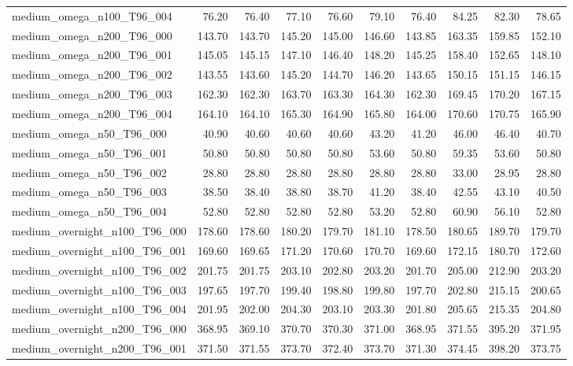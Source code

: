 \begin{table}[htbp]
\begin{tabular}{lrrrrrrrrr}
medium\_omega\_n100\_T96\_004 & 76.20 & 76.40 & 77.10 & 76.60 & 79.10 & 76.40 & 84.25 & 82.30 & 78.65 \\
medium\_omega\_n200\_T96\_000 & 143.70 & 143.70 & 145.20 & 145.00 & 146.60 & 143.85 & 163.35 & 159.85 & 152.10 \\
medium\_omega\_n200\_T96\_001 & 145.05 & 145.15 & 147.10 & 146.40 & 148.20 & 145.25 & 158.40 & 152.65 & 148.10 \\
medium\_omega\_n200\_T96\_002 & 143.55 & 143.60 & 145.20 & 144.70 & 146.20 & 143.65 & 150.15 & 151.15 & 146.15 \\
medium\_omega\_n200\_T96\_003 & 162.30 & 162.30 & 163.70 & 163.30 & 164.30 & 162.30 & 169.45 & 170.20 & 167.15 \\
medium\_omega\_n200\_T96\_004 & 164.10 & 164.10 & 165.30 & 164.90 & 165.80 & 164.00 & 170.60 & 170.75 & 165.90 \\
medium\_omega\_n50\_T96\_000 & 40.90 & 40.60 & 40.60 & 40.60 & 43.20 & 41.20 & 46.00 & 46.40 & 40.70 \\
medium\_omega\_n50\_T96\_001 & 50.80 & 50.80 & 50.80 & 50.80 & 53.60 & 50.80 & 59.35 & 53.60 & 50.80 \\
medium\_omega\_n50\_T96\_002 & 28.80 & 28.80 & 28.80 & 28.80 & 28.80 & 28.80 & 33.00 & 28.95 & 28.80 \\
medium\_omega\_n50\_T96\_003 & 38.50 & 38.40 & 38.80 & 38.70 & 41.20 & 38.40 & 42.55 & 43.10 & 40.50 \\
medium\_omega\_n50\_T96\_004 & 52.80 & 52.80 & 52.80 & 52.80 & 53.20 & 52.80 & 60.90 & 56.10 & 52.80 \\
medium\_overnight\_n100\_T96\_000 & 178.60 & 178.60 & 180.20 & 179.70 & 181.10 & 178.50 & 180.65 & 189.70 & 179.70 \\
medium\_overnight\_n100\_T96\_001 & 169.60 & 169.65 & 171.20 & 170.60 & 170.70 & 169.60 & 172.15 & 180.70 & 172.60 \\
medium\_overnight\_n100\_T96\_002 & 201.75 & 201.75 & 203.10 & 202.80 & 203.20 & 201.70 & 205.00 & 212.90 & 203.20 \\
medium\_overnight\_n100\_T96\_003 & 197.65 & 197.70 & 199.40 & 198.80 & 199.80 & 197.70 & 202.80 & 215.15 & 200.65 \\
medium\_overnight\_n100\_T96\_004 & 201.95 & 202.00 & 204.30 & 203.10 & 203.30 & 201.80 & 205.65 & 215.35 & 204.80 \\
medium\_overnight\_n200\_T96\_000 & 368.95 & 369.10 & 370.70 & 370.30 & 371.00 & 368.95 & 371.55 & 395.20 & 371.95 \\
medium\_overnight\_n200\_T96\_001 & 371.50 & 371.55 & 373.70 & 372.40 & 373.70 & 371.30 & 374.45 & 398.20 & 373.75 \\

\end{tabular}
\end{table}

